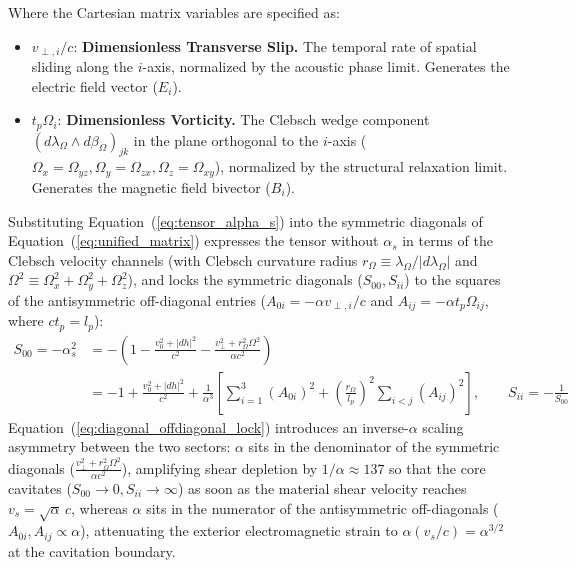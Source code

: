 \vspace{0.3cm}
Where the Cartesian matrix variables are specified as:
\begin{itemize}[noitemsep]
    \item $v_{\perp, i} / c$: \textbf{Dimensionless Transverse Slip.} The temporal rate of spatial sliding along the $i$-axis, normalized by the acoustic phase limit. Generates the electric field vector ($E_i$).
    \item $t_p \Omega_i$: \textbf{Dimensionless Vorticity.} The Clebsch wedge component $(d\lambda_\Omega \wedge d\beta_\Omega)_{jk}$ in the plane orthogonal to the $i$-axis ($\Omega_x = \Omega_{yz}, \Omega_y = \Omega_{zx}, \Omega_z = \Omega_{xy}$), normalized by the structural relaxation limit. Generates the magnetic field bivector ($B_i$). %
\end{itemize}

Substituting Equation~(\ref{eq:tensor_alpha_s}) into the symmetric diagonals of Equation~(\ref{eq:unified_matrix}) expresses the tensor without $\alpha_s$ in terms of the Clebsch velocity channels (with Clebsch curvature radius $r_\Omega \equiv \lambda_\Omega / \vert{}d\lambda_\Omega\vert{}$ and $\Omega^2 \equiv \Omega_x^2 + \Omega_y^2 + \Omega_z^2$), and locks the symmetric diagonals ($S_{00}, S_{ii}$) to the squares of the antisymmetric off-diagonal entries ($A_{0i} = -\alpha v_{\perp,i}/c$ and $A_{ij} = -\alpha t_p \Omega_{ij}$, where $c t_p = l_p$): %
\begin{align} %
    S_{00} = -\alpha_s^2 &= -\left( 1 - \frac{v_0^2 + |dh|^2}{c^2} - \frac{v_\perp^2 + r_\Omega^2 \Omega^2}{\alpha c^2} \right) \nonumber \\ %
    &= -1 + \frac{v_0^2 + |dh|^2}{c^2} + \frac{1}{\alpha^3}\left[ \sum_{i=1}^3 (A_{0i})^2 + \left(\frac{r_\Omega}{l_p}\right)^2 \sum_{i<j} (A_{ij})^2 \right], \qquad S_{ii} = -\frac{1}{S_{00}} \label{eq:diagonal_offdiagonal_lock} %
\end{align} %
Equation~(\ref{eq:diagonal_offdiagonal_lock}) introduces an inverse-$\alpha$ scaling asymmetry between the two sectors: $\alpha$ sits in the denominator of the symmetric diagonals ($\frac{v_\perp^2 + r_\Omega^2\Omega^2}{\alpha c^2}$), amplifying shear depletion by $1/\alpha \approx 137$ so that the core cavitates ($S_{00} \to 0, S_{ii} \to \infty$) as soon as the material shear velocity reaches $v_s = \sqrt{\alpha}\,c$, whereas $\alpha$ sits in the numerator of the antisymmetric off-diagonals ($A_{0i}, A_{ij} \propto \alpha$), attenuating the exterior electromagnetic strain to $\alpha(v_s/c) = \alpha^{3/2}$ at the cavitation boundary. %

